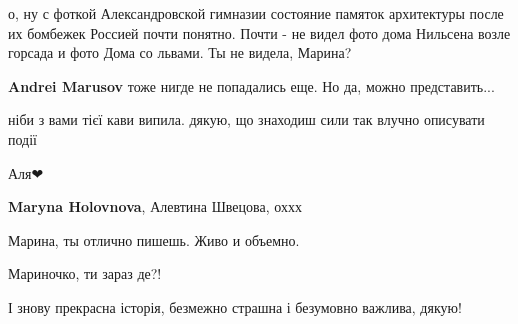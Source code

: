  
 
 
 
 

\qqSecCmt


о, ну с фоткой Александровской гимназии состояние памяток архитектуры после их
бомбежек Россией почти понятно. Почти - не видел фото дома Нильсена возле
горсада и фото Дома со львами. Ты не видела, Марина?

\begin{itemize} %
\textbf{Andrei Marusov} тоже нигде не попадались еще. Но да, можно представить...
\end{itemize} %


ніби з вами тієї кави випила. дякую, що знаходиш сили так влучно описувати події

\begin{itemize} %

Аля❤

\textbf{Maryna Holovnova}, Алевтина Швецова, оххх
\end{itemize} %


Марина, ты отлично пишешь. Живо и объемно.


Мариночко, ти зараз де?!


І знову прекрасна історія, безмежно страшна і безумовно важлива, дякую!
